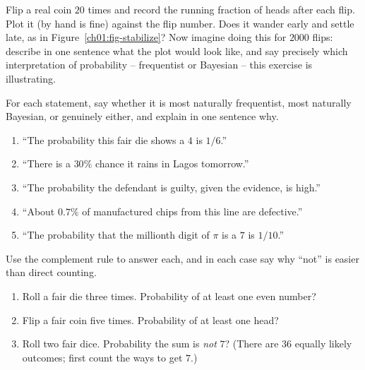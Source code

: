 \begin{exercise}
\label{ch01:ex-sim}
Flip a real coin $20$ times and record the running fraction of heads after each
flip. Plot it (by hand is fine) against the flip number. Does it wander early and
settle late, as in Figure~\ref{ch01:fig-stabilize}? Now imagine doing this for
$2000$ flips: describe in one sentence what the plot would look like, and say
precisely which interpretation of probability -- frequentist or Bayesian -- this
exercise is illustrating.
\end{exercise}

\begin{exercise}
\label{ch01:ex-name}
For each statement, say whether it is most naturally frequentist, most naturally
Bayesian, or genuinely either, and explain in one sentence why.
\begin{enumerate}
\item ``The probability this fair die shows a $4$ is $1/6$.''
\item ``There is a $30\%$ chance it rains in Lagos tomorrow.''
\item ``The probability the defendant is guilty, given the evidence, is high.''
\item ``About $0.7\%$ of manufactured chips from this line are defective.''
\item ``The probability that the millionth digit of $\pi$ is a $7$ is $1/10$.''
\end{enumerate}
\end{exercise}

\begin{exercise}
\label{ch01:ex-comp}
Use the complement rule to answer each, and in each case say why ``not'' is easier
than direct counting.
\begin{enumerate}
\item Roll a fair die three times. Probability of at least one even number?
\item Flip a fair coin five times. Probability of at least one head?
\item Roll two fair dice. Probability the sum is \emph{not} $7$? (There are $36$
equally likely outcomes; first count the ways to get $7$.)
\end{enumerate}
\end{exercise}

